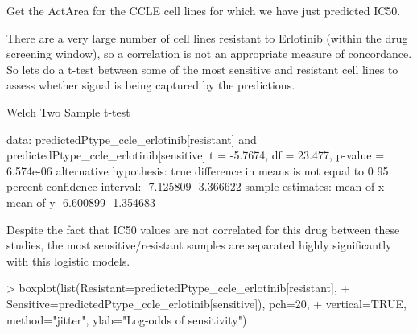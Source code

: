 \documentclass[a4paper]{article}
\begin{document}
Get the ActArea for the CCLE cell lines for which we have just predicted IC50.
\begin{Schunk}
\end{Schunk}

There are a very large number of cell lines resistant to Erlotinib (within the drug screening window), so a correlation is not an appropriate measure of concordance. So lets do a t-test between some of the most sensitive and resistant cell lines to assess whether signal is being captured by the predictions.
\begin{Schunk}
\begin{Soutput}
	Welch Two Sample t-test

data:  predictedPtype_ccle_erlotinib[resistant] and predictedPtype_ccle_erlotinib[sensitive]
t = -5.7674, df = 23.477, p-value = 6.574e-06
alternative hypothesis: true difference in means is not equal to 0
95 percent confidence interval:
 -7.125809 -3.366622
sample estimates:
mean of x mean of y 
-6.600899 -1.354683 
\end{Soutput}
\end{Schunk}

Despite the fact that IC50 values are not correlated for this drug between these studies, the most sensitive/resistant samples are separated highly significantly with this logistic models.
\begin{Schunk}
\begin{Sinput}
> boxplot(list(Resistant=predictedPtype_ccle_erlotinib[resistant], 
+ Sensitive=predictedPtype_ccle_erlotinib[sensitive]), pch=20, 
+ vertical=TRUE, method="jitter", ylab="Log-odds of sensitivity")
\end{Sinput}
\end{Schunk}
\end{document}
